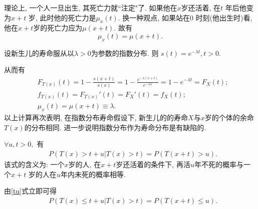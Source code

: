 \documentclass[lang=cn,10pt]{elegantbook}
\begin{document}
\begin{remark}
    理论上, 一个人一旦出生, 其死亡力就``注定"了. 如果他在$x$岁还活着, 在$t$ 年后他变为$x+t$ 岁, 此时他的死亡力是$\mu_x(t).$ 换一种观点, 如果站在0 时刻(他出生时)看, 他在$x+t$岁的死亡力应为$\mu(x+t).$ 故有
    $$\mu_x(t)=\mu(x+t).$$
\end{remark}

\begin{example}
    设新生儿的寿命服从以$\lambda>0$为参数的指数分布. 则
    $s(t)=e^{-\lambda t}, t>0.$
\end{example}
\begin{solution}
    从而有
    \begin{align*}
         & F_{T(x)}(t)=1-\frac{s(x+t)}{s(x)}=1-\frac{e^{-\lambda(x+t)}}{e^{-\lambda x}}=1-e^{-\lambda t} =F_X(t); \\
         & f_{T(x)}(t)=F_{T(x)}'(t)=F_X'(t)=f_X(t);                                                               \\
         & \mu_x(t)=\mu(x+t)\equiv\lambda.
    \end{align*}
    以上计算再次表明, 在指数分布寿命假设下, 新生儿的的寿命$X$与$x$岁的个体的余命$T(x)$的分布相同. 进一步说明指数分布作为寿命分布是有缺陷的.
\end{solution}

\begin{proposition}$\forall u,t>0,$ 有
    \begin{align}
         & P(T(x)>t+u|T(x)>t)=P(T(x+t)>u).\label{tu}
    \end{align}
    该式的含义为: 一个$x$岁的人, 在$x+t$岁还活着的条件下, 再活$u$年不死的概率与一个$x+t$ 岁的人在$u$年内未死的概率相等.
\end{proposition}

\begin{remark}由\eqref{tu}式立即可得
    \begin{align}\label{tul}
         & P(T(x)\leq t+u|T(x)>t)=P(T(x+t)\leq u).
    \end{align}
\end{remark}
\end{document}
